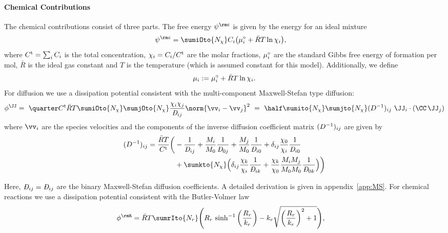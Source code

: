 \paragraph{Chemical Contributions} %
  The chemical contributions consist of three parts. The free energy $\psic$ is given by the energy for an ideal mixture
    \begin{align}
      &\psic =  \sumiOto{\Nchi} C_i \big(\munord_i + \RT\ln\chii \big), \label{eq:psic}
    \end{align}
    where $C^{\rm t}=\sum_i C_i$ is the total concentration, $\chi_{i}=C_i/C^{\rm t}$ are the molar fractions, $\mu^{\circ}_i$ are the standard Gibbs free energy of formation per mol, $\bar R$ is the ideal gas constant and $T$ is the temperature (which is assumed constant for this model). Additionally, we define
    \begin{align}
      \mu_i := \mu^{\circ}_i + \bar{R}T \ln\chi_i.
    \end{align}
    For diffusion we use a dissipation potential consistent with the multi-component Maxwell-Stefan type diffusion: 
    \begin{align}
      \begin{aligned}
      \phiJJ = \ \quarter\Ct\RT\sumiOto{\Nchi}\sumjOto{\Nchi} \frac{\chi_i\chi_j}{\DiffMS_{ij}} \norm{\vv_i-\vv_j}^2 \ = \  \half \sumito{\Nchi}\sumjto{\Nchi} \Dijinv \ \JJ_i \cdot (\CC \, \JJ_j)
      \end{aligned}
    \end{align}
    where $\vv_i$ are the species velocities and the components of the inverse diffusion coefficient matrix $(D^{-1})_{ij}$ are given by
    \begin{align}
      \begin{aligned}
      \Dijinv = \frac{\RT}{\Ct} 
      \bigg(  
        &- \frac{1}{\DiffMS_{ij}} 
        + \frac{M_i}{M_0}\frac{1}{\DiffMS_{0j}} 
        + \frac{M_j}{M_0}\frac{1}{\DiffMS_{i0}}  
        + \delta_{ij}\frac{\chi_0}{\chi_i}\frac{1}{\DiffMS_{i0}} \\
        &+ \sumkto{\Nchi} \Big( \delta_{ij} \frac{\chi_k}{\chi_i}\frac{1}{\DiffMS_{ik}} + \frac{\chi_k}{\chi_0}\frac{M_i M_j}{M_0 M_0} \frac{1}{\DiffMS_{0k}} \Big) 
      \bigg)
      \end{aligned}
    \end{align}
    
    Here, $\DiffMS_{ij}=\DiffMS_{ij}$ are the binary Maxwell-Stefan diffusion coefficients. A detailed derivation is given in appendix~\ref{app:MS}. For chemical reactions we use a dissipation potential consistent with the Butler-Volmer law
    \begin{align}
      &\phi^\rmR = \RT \sumrIto{N_r} \Bigg( R_r \, \sinh^{-1}\bigg(\frac{R_r}{\kr}\bigg) - k_r\sqrt{\bigg(\frac{R_r}{k_r}\bigg)^2+1}\Bigg),
    \end{align}
  
